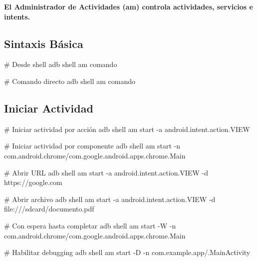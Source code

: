 \documentclass[
  doc,
  floatsintext,
  longtable,
  a4paper,
  nolmodern,
  notxfonts,
  notimes,
  12pt,
  colorlinks=true,linkcolor=blue,citecolor=blue,urlcolor=blue]{apa7}
\newenvironment{Shaded}{\begin{snugshade}}{\end{snugshade}}
\newcommand{\AttributeTok}[1]{\textcolor[rgb]{0.40,0.45,0.13}{#1}}
\newcommand{\CommentTok}[1]{\textcolor[rgb]{0.37,0.37,0.37}{#1}}
\newcommand{\ExtensionTok}[1]{\textcolor[rgb]{0.00,0.23,0.31}{#1}}
\newcommand{\NormalTok}[1]{\textcolor[rgb]{0.00,0.23,0.31}{#1}}
\begin{document}
\textbf{El Administrador de Actividades (am) controla actividades,
servicios e intents.}

\subsection{Sintaxis Básica}\label{sintaxis-buxe1sica}

\begin{Shaded}
\begin{Highlighting}[]
\CommentTok{\# Desde shell}
\ExtensionTok{adb}\NormalTok{ shell}
\ExtensionTok{am}\NormalTok{ comando}

\CommentTok{\# Comando directo}
\ExtensionTok{adb}\NormalTok{ shell am comando}
\end{Highlighting}
\end{Shaded}

\subsection{Iniciar Actividad}\label{iniciar-actividad}

\begin{Shaded}
\begin{Highlighting}[]
\CommentTok{\# Iniciar actividad por acción}
\ExtensionTok{adb}\NormalTok{ shell am start }\AttributeTok{{-}a}\NormalTok{ android.intent.action.VIEW}

\CommentTok{\# Iniciar actividad por componente}
\ExtensionTok{adb}\NormalTok{ shell am start }\AttributeTok{{-}n}\NormalTok{ com.android.chrome/com.google.android.apps.chrome.Main}

\CommentTok{\# Abrir URL}
\ExtensionTok{adb}\NormalTok{ shell am start }\AttributeTok{{-}a}\NormalTok{ android.intent.action.VIEW }\AttributeTok{{-}d}\NormalTok{ https://google.com}

\CommentTok{\# Abrir archivo}
\ExtensionTok{adb}\NormalTok{ shell am start }\AttributeTok{{-}a}\NormalTok{ android.intent.action.VIEW }\AttributeTok{{-}d}\NormalTok{ file:///sdcard/documento.pdf}

\CommentTok{\# Con espera hasta completar}
\ExtensionTok{adb}\NormalTok{ shell am start }\AttributeTok{{-}W} \AttributeTok{{-}n}\NormalTok{ com.android.chrome/com.google.android.apps.chrome.Main}

\CommentTok{\# Habilitar debugging}
\ExtensionTok{adb}\NormalTok{ shell am start }\AttributeTok{{-}D} \AttributeTok{{-}n}\NormalTok{ com.example.app/.MainActivity}
\end{Highlighting}
\end{Shaded}
\end{document}
